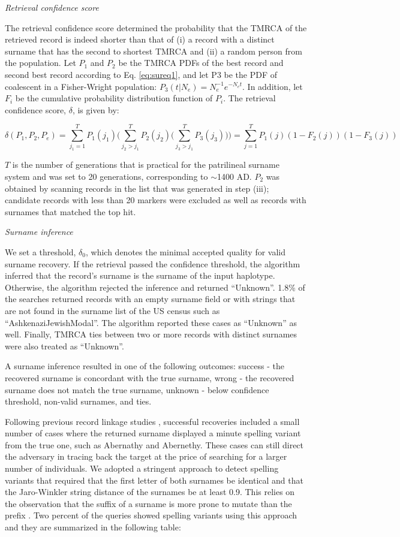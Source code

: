 \emph{Retrieval confidence score}

The retrieval confidence score determined the probability that the TMRCA of the retrieved record is indeed shorter than that of (i) a record with a distinct surname that has the second to shortest TMRCA and (ii) a random person from the population. Let $P_1$ and $P_2$ be the TMRCA PDFs of the best record and second best record according to Eq. \ref{eq:sureq1}, and let P3 be the PDF of coalescent in a Fisher-Wright population: $P_3 (t|N_e)=N_e^{-1} e^{-N_e t}$. In addition, let $F_i$ be the cumulative probability distribution function of $P_i$. The retrieval confidence score, $\delta$, is given by:

\begin{equation}
\delta(P_1,P_2,P_e) = \sum_{j_1=1}^TP_1(j_1)
\Bigg(
\sum_{j_2>j_1}^TP_2(j_2)
 \Big(
 \sum_{j_3>j_1}^TP_3(j_3)
 \Big)
\Bigg) = \sum_{j=1}^TP_1(j)(1-F_2(j))(1-F_3(j))
\end{equation}

$T$ is the number of generations that is practical for the patrilineal surname system and was set to 20 generations, corresponding to $\sim$1400 AD. $P_2$ was obtained by scanning records in the list that was generated in step (iii); candidate records with less than 20 markers were excluded as well as records with surnames that matched the top hit.

\emph{Surname inference}

We set a threshold, $\delta_0$, which denotes the minimal accepted quality for valid surname recovery. If the retrieval passed the confidence threshold, the algorithm inferred that the record's surname is the surname of the input haplotype. Otherwise, the algorithm rejected the inference and returned ``Unknown''. 1.8\% of the searches returned records with an empty surname field or with strings that are not found in the surname list of the US census such as ``AshkenaziJewishModal''. The algorithm reported these cases as ``Unknown'' as well. Finally, TMRCA ties between two or more records with distinct surnames were also treated as ``Unknown''. 

A surname inference resulted in one of the following outcomes: success - the recovered surname is concordant with the true surname, wrong - the recovered surname does not match the true surname, unknown - below confidence threshold, non-valid surnames, and ties.  

Following previous record linkage studies \cite{GrannisOverhageMcDonald2004,Winkler1995}, successful recoveries included a small number of cases where the returned surname displayed a minute spelling variant from the true one, such as Abernathy and Abernethy. These cases can still direct the adversary in tracing back the target at the price of searching for a larger number of individuals. We adopted a stringent approach to detect spelling variants that required that the first letter of both surnames be identical and that the Jaro-Winkler string distance \cite{Winkler1995} of the surnames be at least 0.9. This relies on the observation that the suffix of a surname is more prone to mutate than the prefix \cite{Winkler1995}. Two percent of the queries showed spelling variants using this approach and they are summarized in the following table:

